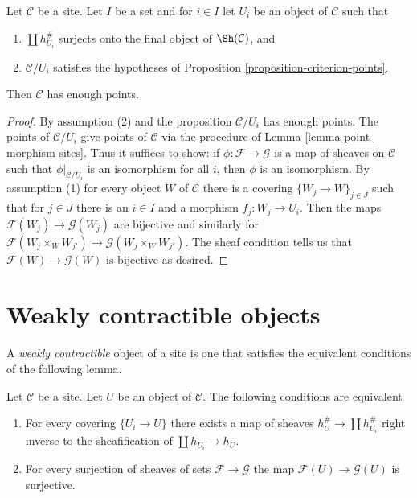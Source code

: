 \begin{lemma}
\label{lemma-criterion-points}
Let $\mathcal{C}$ be a site. Let $I$ be a set and for
$i \in I$ let $U_i$ be an object of $\mathcal{C}$ such that
\begin{enumerate}
\item $\coprod h_{U_i}^\#$ surjects onto
the final object of $\Sh(\mathcal{C})$, and
\item $\mathcal{C}/U_i$ satisfies the hypotheses of
Proposition \ref{proposition-criterion-points}.
\end{enumerate}
Then $\mathcal{C}$ has enough points.
\end{lemma}

\begin{proof}
By assumption (2) and the proposition $\mathcal{C}/U_i$ has enough points.
The points of $\mathcal{C}/U_i$ give points of $\mathcal{C}$
via the procedure of Lemma \ref{lemma-point-morphism-sites}.
Thus it suffices to show: if $\phi : \mathcal{F} \to \mathcal{G}$
is a map of sheaves on $\mathcal{C}$ such that $\phi|_{\mathcal{C}/U_i}$
is an isomorphism for all $i$, then $\phi$ is an isomorphism.
By assumption (1) for every object $W$ of $\mathcal{C}$
there is a covering $\{W_j \to W\}_{j \in J}$
such that for $j \in J$ there is an $i \in I$ and a morphism
$f_j : W_j \to U_i$. Then the maps
$\mathcal{F}(W_j) \to \mathcal{G}(W_j)$
are bijective and similarly for
$\mathcal{F}(W_j \times_W W_{j'}) \to \mathcal{G}(W_j \times_W W_{j'})$.
The sheaf condition tells us that $\mathcal{F}(W) \to \mathcal{G}(W)$
is bijective as desired.
\end{proof}




\section{Weakly contractible objects}
\label{section-w-contractible}

\noindent
A {\it weakly contractible} object of a site is one that satisfies
the equivalent conditions of the following lemma.

\begin{lemma}
\label{lemma-w-contractible}
Let $\mathcal{C}$ be a site. Let $U$ be an object of $\mathcal{C}$.
The following conditions are equivalent
\begin{enumerate}
\item For every covering $\{U_i \to U\}$ there exists a map of
sheaves $h_U^\# \to \coprod h_{U_i}^\#$ right inverse to the sheafification
of $\coprod h_{U_i} \to h_U$.
\item For every surjection of sheaves of sets $\mathcal{F} \to \mathcal{G}$
the map $\mathcal{F}(U) \to \mathcal{G}(U)$ is surjective.
\end{enumerate}
\end{lemma}

